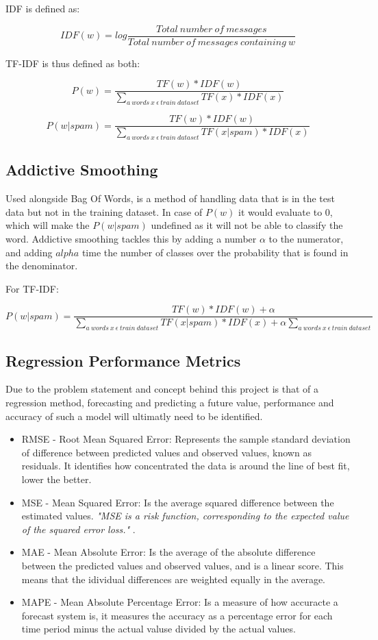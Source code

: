 \documentclass[oneside, 12pt]{article}
\begin{document}
			IDF is defined as:
			
			\[IDF(w) = log\frac{Total\ number\ of\ messages}{Total\ number\ of\ messages\ containing\ w}\]
			
			TF-IDF is thus defined as both:
			
			\[P(w) = \frac{TF(w)*IDF(w)}{\sum _{a\ words\ x\ \epsilon\ train\ dataset} TF(x)*IDF(x)}\]
			
			\[P(w|spam) = \frac{TF(w)*IDF(w)}{\sum _{a\ words\ x\ \epsilon\ train\ dataset} TF(x|spam)*IDF(x)}\]
				
			\cite{SpamCScratch}
			
			\subsection{Addictive Smoothing}
			Used alongside Bag Of Words, is a method of handling data that is in the test data but not in the training dataset. In case of $P(w)$ it would evaluate to 0, which will make the $P(w|spam)$ undefined as it will not be able to classify the word. Addictive smoothing tackles this by adding a number $\alpha$ to the numerator, and adding $alpha$ time the number of classes over the probability that is found in the denominator. \cite{SpamCScratch}
			\newline
			
			For TF-IDF:
			
			\[P(w|spam) = \frac{TF(w)*IDF(w) + \alpha}{\sum _{a\ words\ x\ \epsilon\ train\ dataset} TF(x|spam)*IDF(x) + \alpha\sum_{a\ words\ x\ \epsilon\ train\ dataset}}\]
			
			\subsection{Regression Performance Metrics}
			Due to the problem statement and concept behind this project is that of a regression method, forecasting and predicting a future value, performance and accuracy of such a model will ultimatly need to be identified.
			
			\begin{itemize}
				\item RMSE - Root Mean Squared Error: Represents the sample standard deviation of difference between predicted values and observed values, known as residuals. It identifies how concentrated the data is around the line of best fit, lower the better. \cite{RMSEMAE}
				\item MSE - Mean Squared Error: Is the average squared difference between the estimated values. \textit{"MSE is a risk function, corresponding to the expected value of the squared error loss."} \cite{MSE}.
				\item MAE - Mean Absolute Error: Is the average of the absolute difference between the predicted values and observed values, and is a linear score. This means that the idividual differences are weighted equally in the average. \cite{RMSEMAE}
				\item MAPE - Mean Absolute Percentage Error: Is a measure of how accuracte a forecast system is, it measures the accuracy as a percentage error for each time period minus the actual valuse divided by the actual values. \cite{MAPE}
			\end{itemize}
		
\end{document}
